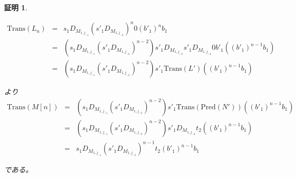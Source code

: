 \documentclass[dvipdfmx,uplatex]{jsarticle}
\theoremstyle{customnonumberbreakfortheorem}
\theoremstyle{customnonumberbreakforproof}
\newtheorem{hideableproof}{証明}
\begin{document}
\begin{hideableproof}
\begin{indented}
		\begin{eqnarray*}
		\textrm{Trans}(L_n) & = & s_1 D_{M_{1,j_{-1}}} (s'_1 D_{M_{1,j_{-2}}})^n 0 (b'_1)^n b_1 \\
		& = & (s_1 D_{M_{1,j_{-1}}} (s'_1 D_{M_{1,j_{-2}}})^{n-2}) s'_1 D_{M_{1,j_{-2}}} s'_1 D_{M_{1,j_{-2}}} 0 b'_1 ((b'_1)^{n-1} b_1) \\
		& = & (s_1 D_{M_{1,j_{-1}}} (s'_1 D_{M_{1,j_{-2}}})^{n-2}) s'_1 \textrm{Trans}(L') ((b'_1)^{n-1} b_1)
		\end{eqnarray*}
		\begin{indented}
			\item より
			\begin{eqnarray*}
			\textrm{Trans}(M[n]) & = & (s_1 D_{M_{1,j_{-1}}} (s'_1 D_{M_{1,j_{-2}}})^{n-2}) s'_1 \textrm{Trans}(\textrm{Pred}(N')) ((b'_1)^{n-1} b_1) \\
			& = & (s_1 D_{M_{1,j_{-1}}} (s'_1 D_{M_{1,j_{-2}}})^{n-2}) s'_1 D_{M_{1,j_{-2}}} t_2 ((b'_1)^{n-1} b_1) \\
			& = & s_1 D_{M_{1,j_{-1}}} (s'_1 D_{M_{1,j_{-2}}})^{n-1} t_2 (b'_1)^{n-1} b_1
			\end{eqnarray*}
			\item である。
		\end{indented}
	\end{indented}
\end{hideableproof}
\end{document}

